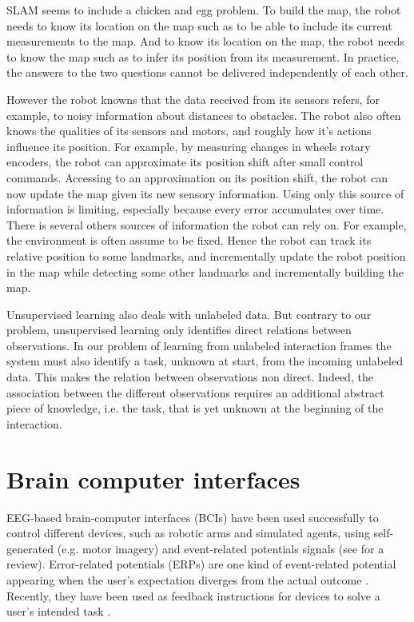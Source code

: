SLAM seems to include a chicken and egg problem. To build the map, the robot needs to know its location on the map such as to be able to include its current measurements to the map. And to know its location on the map, the robot needs to know the map such as to infer its position from its measurement. In practice, the answers to the two questions cannot be delivered independently of each other.

However the robot knowns that the data received from its sensors refers, for example, to noisy information about distances to obstacles. The robot also often knows the qualities of its sensors and motors, and roughly how it's actions influence its position. For example, by measuring changes in wheels rotary encoders, the robot can approximate its position shift after small control commands. Accessing to an approximation on its position shift, the robot can now update the map given its new sensory information. Using only this source of information is limiting, especially because every error accumulates over time. There is several others sources of information the robot can rely on. For example, the environment is often assume to be fixed. Hence the robot can track its relative position to some landmarks, and incrementally update the robot position in the map while detecting some other landmarks and incrementally building the map.

\transition

Unsupervised learning also deals with unlabeled data. But contrary to our problem, unsupervised learning only identifies direct relations between observations. In our problem of learning from unlabeled interaction frames the system must also identify a task, unknown at start, from the incoming unlabeled data. This makes the relation between observations non direct. Indeed, the association between the different observations requires an additional abstract piece of knowledge, i.e. the task, that is yet unknown at the beginning of the interaction.

\section{Brain computer interfaces}

EEG-based brain-computer interfaces (BCIs) have been used successfully to control different devices, such as robotic arms and simulated agents, using self-generated (e.g. motor imagery) and event-related potentials signals (see \cite{millan10} for a review). Error-related potentials (ERPs) are one kind of event-related potential appearing when the user's expectation diverges from the actual outcome \cite{Falkenstein00,chavarriaga2014errare}. Recently, they have been used as feedback instructions for devices to solve a user's intended task \cite{chavarriaga2010learning,iturrate13}.

